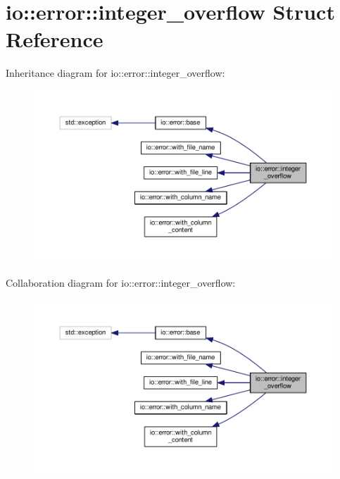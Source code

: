 \section{io\+:\+:error\+:\+:integer\+\_\+overflow Struct Reference}
\label{structio_1_1error_1_1integer__overflow}


Inheritance diagram for io\+:\+:error\+:\+:integer\+\_\+overflow\+:\nopagebreak
\begin{figure}[H]
\begin{center}
\leavevmode
\includegraphics[width=350pt]{structio_1_1error_1_1integer__overflow__inherit__graph}
\end{center}
\end{figure}


Collaboration diagram for io\+:\+:error\+:\+:integer\+\_\+overflow\+:\nopagebreak
\begin{figure}[H]
\begin{center}
\leavevmode
\includegraphics[width=350pt]{structio_1_1error_1_1integer__overflow__coll__graph}
\end{center}
\end{figure}
